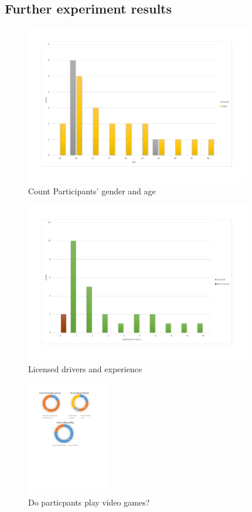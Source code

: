 \chapter{}

\section{Further experiment results}

\begin{figure}[!htb]
	\centering
	\includegraphics[height=7cm]{charts/genderAge.pdf}
	\caption[Age and gender of experiments particpants]{Count Participants' gender and age }
	\label{fig:chart-genderage}
\end{figure}

\begin{figure}[!htb]
	\centering
	\includegraphics[height=7cm]{charts/licenseddriversexperience.pdf}
	\caption[Particpants Licensed drivers and driving experience]{Licensed drivers and experience}
	\label{fig:chart-licenseddriversexperience}
\end{figure}

\begin{figure}[!htb]
	\centering
	\includegraphics[height=5cm]{charts/playVideoGames.pdf}
	\caption[Do particpants play video games?]{Do particpants play video games?}
	\label{fig:chart-playVideoGames}
\end{figure}

